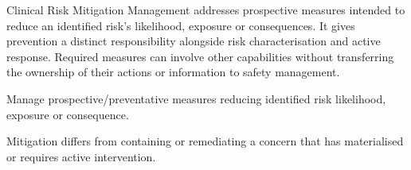 Clinical Risk Mitigation Management addresses prospective measures intended to reduce an identified risk's likelihood, exposure or consequences. It gives prevention a distinct responsibility alongside risk characterisation and active response. Required measures can involve other capabilities without transferring the ownership of their actions or information to safety management.



Manage prospective/\allowbreak{}preventative measures reducing identified risk likelihood, exposure or consequence.



Mitigation differs from containing or remediating a concern that has materialised or requires active intervention.


